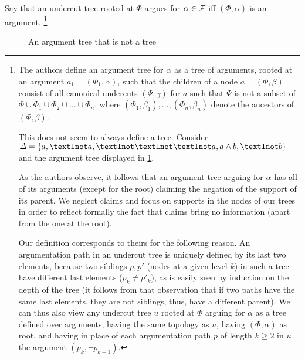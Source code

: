 \documentclass[version=3.21, pagesize, twoside=off, bibliography=totoc, DIV=calc, fontsize=12pt, a4paper, french, english]{scrartcl}
\begin{document}
Say that an undercut tree rooted at $\Phi$ argues for $\alpha \in \mathcal{F}$ iff $(\Phi, \alpha)$ is an argument.
\footnote{The authors define an argument tree for $\alpha$ as a tree of arguments, rooted at an argument $a_1 = (\Phi_1, \alpha)$, such that the children of a node $a = (\Phi, \beta)$ consist of all canonical undercuts $(\Psi, \gamma)$ for $a$ such that $\Psi$ is not a subset of $\Phi \cup \Phi_1 \cup \Phi_2 \cup … \cup \Phi_n$, where $(Φ_1, \beta_1), …, (Φ_n, \beta_n)$ denote the ancestors of $(\Phi, \beta)$.

This does not seem to always define a tree. Consider $\Delta = \set{a, ¬a, ¬¬¬a, a \land b, ¬b}$ and the argument tree displayed in \cref{fig:notTree}.

As the authors observe, it follows that an argument tree arguing for $\alpha$ has all of its arguments (except for the root) claiming the negation of the support of its parent. We neglect claims and focus on supports in the nodes of our trees in order to reflect formally the fact that claims bring no information (apart from the one at the root).

Our definition corresponds to theirs for the following reason.
An argumentation path in an undercut tree is uniquely defined by its last two elements, because two siblings $p, p'$ (nodes at a given level $k$) in such a tree have different last elements ($p_k ≠ p'_k$), as is easily seen by induction on the depth of the tree (it follows from that observation that if two paths have the same last elements, they are not siblings, thus, have a different parent).
We can thus also view any undercut tree $u$ rooted at $\Phi$ arguing for $\alpha$ as a tree defined over arguments, having the same topology as $u$, having $(\Phi, \alpha)$ as root, and having in place of each argumentation path $p$ of length $k ≥ 2$ in $u$ the argument $(p_k, ¬p_{k - 1})$.
}

\begin{figure}
	\caption{An argument tree that is not a tree}
	\label{fig:notTree}
\end{figure}
\end{document}

